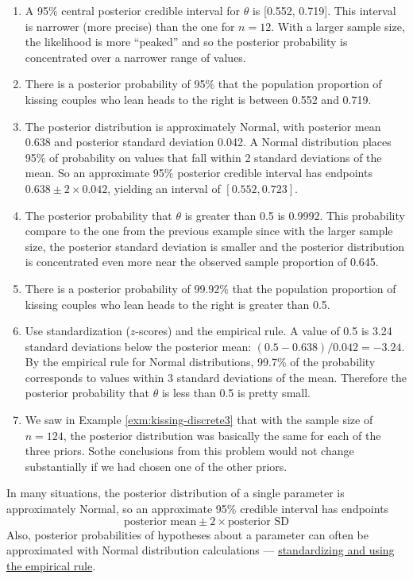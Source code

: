 \documentclass[
]{book}
\providecommand{\tightlist}{%
  \setlength{\itemsep}{0pt}\setlength{\parskip}{0pt}}
\theoremstyle{definition}
\theoremstyle{definition}
\theoremstyle{definition}
\theoremstyle{remark}
\begin{document}
\begin{enumerate}
\def\labelenumi{\arabic{enumi}.}
\tightlist
\item
  A 95\% central posterior credible interval for \(\theta\) is {[}0.552, 0.719{]}. This interval is narrower (more precise) than the one for \(n=12\). With a larger sample size, the likelihood is more ``peaked'' and so the posterior probability is concentrated over a narrower range of values.
\item
  There is a posterior probability of 95\% that the population proportion of kissing couples who lean heads to the right is between 0.552 and 0.719.
\item
  The posterior distribution is approximately Normal, with posterior mean 0.638 and posterior standard deviation 0.042. A Normal distribution places 95\% of probability on values that fall within 2 standard deviations of the mean. So an approximate 95\% posterior credible interval has endpoints \(0.638 \pm 2 \times 0.042\), yielding an interval of \([0.552, 0.723]\).
\item
  The posterior probability that \(\theta\) is greater than 0.5 is 0.9992. This probability compare to the one from the previous example since with the larger sample size, the posterior standard deviation is smaller and the posterior distribution is concentrated even more near the observed sample proportion of 0.645.
\item
  There is a posterior probability of 99.92\% that the population proportion of kissing couples who lean heads to the right is greater than 0.5.
\item
  Use standardization (\(z\)-scores) and the empirical rule. A value of 0.5 is 3.24 standard deviations below the posterior mean: \((0.5 - 0.638)/0.042 = -3.24\). By the empirical rule for Normal distributions, 99.7\% of the probability corresponds to values within 3 standard deviations of the mean. Therefore the posterior probability that \(\theta\) is less than 0.5 is pretty small.
\item
  We saw in Example \ref{exm:kissing-discrete3} that with the sample size of \(n=124\), the posterior distribution was basically the same for each of the three priors. Sothe conclusions from this problem would not change substantially if we had chosen one of the other priors.
\end{enumerate}

In many situations, the posterior distribution of a single parameter is approximately Normal, so an approximate 95\% credible interval has endpoints
\[
\text{posterior mean} \pm 2 \times \text{posterior SD}
\]
Also, posterior probabilities of hypotheses about a parameter can often be approximated with Normal distribution calculations --- \href{https://bookdown.org/kevin_davisross/probsim-book/normal-distributions.html}{standardizing and using the empirical rule}.
\end{document}
